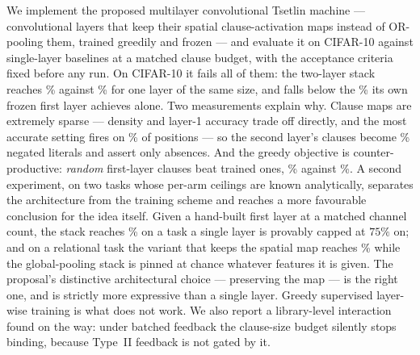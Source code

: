 We implement the proposed multilayer convolutional Tsetlin machine --- convolutional layers
that keep their spatial clause-activation maps instead of OR-pooling them, trained greedily
and frozen --- and evaluate it on CIFAR-10 against single-layer baselines at a matched clause
budget, with the acceptance criteria fixed before any run. On CIFAR-10 it fails all of them:
the two-layer stack reaches \accMctm{}\% against \accSingleMatched{}\% for one layer of the
same size, and falls below the \accSingleLOne{}\% its own frozen first layer achieves alone.
Two measurements explain why. Clause maps are extremely sparse --- density and layer-1
accuracy trade off directly, and the most accurate setting fires on
\densitySparsestFire{}\% of positions --- so the second layer's clauses become \negMctm{}\%
negated literals and assert only absences. And the greedy objective is counter-productive:
\emph{random} first-layer clauses beat trained ones, \accMctmRandom{}\% against
\accMctm{}\%. A second experiment, on two tasks whose per-arm ceilings are known
analytically, separates the architecture from the training scheme and reaches a more
favourable conclusion for the idea itself. Given a hand-built first layer at a matched
channel count, the stack reaches \synXorFlatStackOracleSixFour{}\% on a task a single layer
is provably capped at $75\%$ on; and on a relational task the variant that keeps the spatial
map reaches \synNearMctmTask{}\% while the global-pooling stack is pinned at chance whatever
features it is given. The proposal's distinctive architectural choice --- preserving the map
--- is the right one, and is strictly more expressive than a single layer. Greedy supervised
layer-wise training is what does not work. We also report a library-level interaction found
on the way: under batched feedback the  clause-size budget
silently stops binding, because Type~II feedback is not gated by it.
